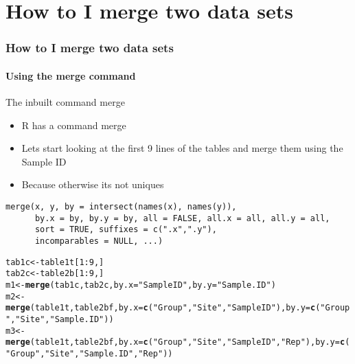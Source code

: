 \documentclass{article}\usepackage[]{graphicx}\usepackage[]{color}
\makeatletter
\newcommand{\hlnum}[1]{\textcolor[rgb]{0.686,0.059,0.569}{#1}}%
\newcommand{\hlstr}[1]{\textcolor[rgb]{0.192,0.494,0.8}{#1}}%
\newcommand{\hlopt}[1]{\textcolor[rgb]{0,0,0}{#1}}%
\newcommand{\hlstd}[1]{\textcolor[rgb]{0.345,0.345,0.345}{#1}}%
\newcommand{\hlkwb}[1]{\textcolor[rgb]{0.69,0.353,0.396}{#1}}%
\newcommand{\hlkwc}[1]{\textcolor[rgb]{0.333,0.667,0.333}{#1}}%
\newcommand{\hlkwd}[1]{\textcolor[rgb]{0.737,0.353,0.396}{\textbf{#1}}}%
\newenvironment{kframe}{%
 \def\at@end@of@kframe{}%
 \ifinner\ifhmode%
  \def\at@end@of@kframe{\end{minipage}}%
  \begin{minipage}{\columnwidth}%
 \fi\fi%
 \def\FrameCommand##1{\hskip\@totalleftmargin \hskip-\fboxsep
 \colorbox{shadecolor}{##1}\hskip-\fboxsep
     \hskip-\linewidth \hskip-\@totalleftmargin \hskip\columnwidth}%
 \MakeFramed {\advance\hsize-\width
   \@totalleftmargin\z@ \linewidth\hsize
   \@setminipage}}%
 {\par\unskip\endMakeFramed%
 \at@end@of@kframe}
\newenvironment{knitrout}{}{} %
\makeatother
\begin{document}
\section*{How to I merge two data sets}
\begin{frame}[fragile]
  \frametitle{How to I merge two data sets}
  \framesubtitle{Using the merge command}

\begin{block}{The inbuilt command merge}
\begin{itemize}
\item R has a command merge
\item Lets start looking at the first 9 lines of the tables and merge them using the Sample ID
\item Because otherwise its not uniques
\end{itemize}
\end{block}
\begin{lstlisting}
merge(x, y, by = intersect(names(x), names(y)),
      by.x = by, by.y = by, all = FALSE, all.x = all, all.y = all,
      sort = TRUE, suffixes = c(".x",".y"),
      incomparables = NULL, ...)
\end{lstlisting}

\begin{knitrout}
\color{fgcolor}\begin{kframe}
\begin{alltt}
\hlstd{tab1c}\hlkwb{<-}\hlstd{table1t[}\hlnum{1}\hlopt{:}\hlnum{9}\hlstd{,]}
\hlstd{tab2c}\hlkwb{<-}\hlstd{table2b[}\hlnum{1}\hlopt{:}\hlnum{9}\hlstd{,]}
\hlstd{m1}\hlkwb{<-}\hlkwd{merge}\hlstd{(tab1c,tab2c,}\hlkwc{by.x}\hlstd{=}\hlstr{"Sample ID"}\hlstd{,}\hlkwc{by.y}\hlstd{=}\hlstr{"Sample.ID"}\hlstd{)}
\hlstd{m2}\hlkwb{<-}\hlkwd{merge}\hlstd{(table1t,table2bf,}\hlkwc{by.x}\hlstd{=}\hlkwd{c}\hlstd{(}\hlstr{"Group"}\hlstd{,}\hlstr{"Site"}\hlstd{,}\hlstr{"Sample ID"}\hlstd{),}\hlkwc{by.y}\hlstd{=}\hlkwd{c}\hlstd{(}\hlstr{"Group"}\hlstd{,}\hlstr{"Site"}\hlstd{,}\hlstr{"Sample.ID"}\hlstd{))}
\hlstd{m3}\hlkwb{<-}\hlkwd{merge}\hlstd{(table1t,table2bf,}\hlkwc{by.x}\hlstd{=}\hlkwd{c}\hlstd{(}\hlstr{"Group"}\hlstd{,}\hlstr{"Site"}\hlstd{,}\hlstr{"Sample ID"}\hlstd{,}\hlstr{"Rep"}\hlstd{),}\hlkwc{by.y}\hlstd{=}\hlkwd{c}\hlstd{(}\hlstr{"Group"}\hlstd{,}\hlstr{"Site"}\hlstd{,}\hlstr{"Sample.ID"}\hlstd{,}\hlstr{"Rep"}\hlstd{))}
\end{alltt}
\end{kframe}
\end{knitrout}
\end{frame}  
\end{document}

